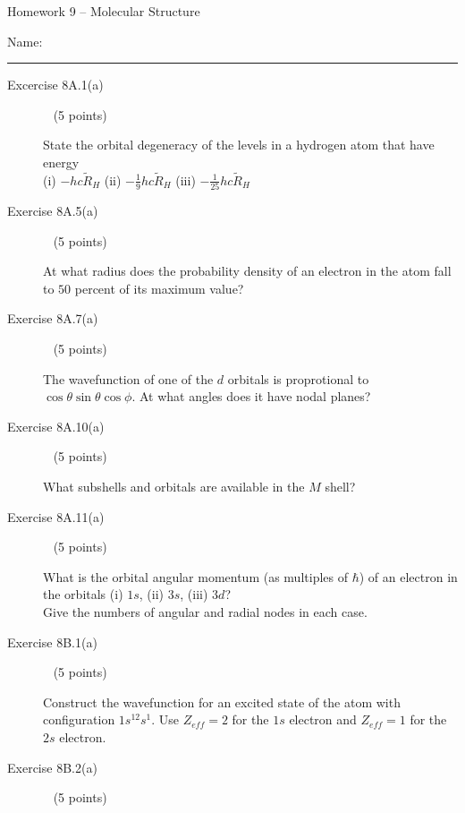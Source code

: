 \documentclass[10pt, letterpaper]{memoir}
\begin{document}
\begin{center}
	{\large Homework 9 -- Molecular Structure}
\end{center}

Name: \rule[-.1mm]{15em}{0.1pt}

\begin{description}
	\item [Excercise 8A.1(a)] ~ (5 points)
	
	State the orbital degeneracy of the levels in a hydrogen atom that have energy \\(i) $-hc\tilde{R}_H$ (ii) $-\frac{1}{9}hc\tilde{R}_H$ (iii) $-\frac{1}{25}hc\tilde{R}_H$
	
	\vspace{8em}
	\item [Exercise 8A.5(a)] ~ (5 points)
	
	At what radius does the probability density of an electron in the  atom fall to $50$ percent of its maximum value?
	
	\vspace{14em}
	\item [Exercise 8A.7(a)] ~ (5 points)
	
	The wavefunction of one of the $d$ orbitals is proprotional to $\cos\theta\sin\theta\cos\phi$. At what angles does it have nodal planes?
	
	\vspace{12em}
	\item [Exercise 8A.10(a)] ~ (5 points)
	
	What subshells and orbitals are available in the $M$ shell?

	\vspace{10em}
	\item [Exercise 8A.11(a)] ~ (5 points)
	
	What is the orbital angular momentum (as multiples of $\hbar$) of an electron in the orbitals (i) $1s$, (ii) $3s$, (iii) $3d$? \\Give the numbers of angular and radial nodes in each case.
	
	\vspace{12em}
	\item [Exercise 8B.1(a)] ~ (5 points)
	
	Construct the wavefunction for an excited state of the  atom with configuration $1s^12s^1$. Use $Z_{eff}=2$ for the $1s$ electron and $Z_{eff}=1$ for the $2s$ electron.
	
	\vspace{8em}
	\item [Exercise 8B.2(a)] ~ (5 points)
	

\end{description}
\end{document}
